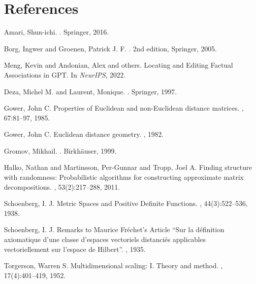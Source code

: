\documentclass[11pt]{article}
\newcommand{\1}{\mathbf{1}}
\begin{document}
\FloatBarrier
\clearpage
\section{References}
\vspace{-0.25em}

\begin{thebibliography}{99}

Amari, Shun-ichi.
.
\newblock Springer, 2016.

Borg, Ingwer and Groenen, Patrick J. F.
.
\newblock 2nd edition, Springer, 2005.

Meng, Kevin and Andonian, Alex and others.
\newblock Locating and Editing Factual Associations in GPT.
\newblock In {\em NeurIPS}, 2022.

Deza, Michel M. and Laurent, Monique.
.
\newblock Springer, 1997.

Gower, John C.
\newblock Properties of Euclidean and non-Euclidean distance matrices.
, 67:81--97, 1985.

Gower, John C.
\newblock Euclidean distance geometry.
, 1982.

Gromov, Mikhail.
.
\newblock Birkh\"auser, 1999.

Halko, Nathan and Martinsson, Per-Gunnar and Tropp, Joel A.
\newblock Finding structure with randomness: Probabilistic algorithms for constructing approximate matrix decompositions.
, 53(2):217--288, 2011.

Schoenberg, I. J.
\newblock Metric Spaces and Positive Definite Functions.
, 44(3):522--536, 1938.

Schoenberg, I. J.
\newblock Remarks to Maurice Fr\'echet's Article ``Sur la d\'efinition axiomatique d'une classe d'espaces vectoriels distanci\'es applicables vectoriellement sur l'espace de Hilbert''.
, 1935.

Torgerson, Warren S.
\newblock Multidimensional scaling: I. Theory and method.
, 17(4):401--419, 1952.


\end{thebibliography}
\end{document}
